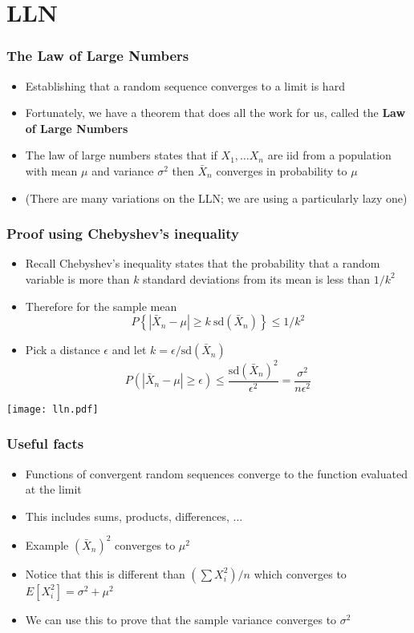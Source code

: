 \documentclass[aspectratio=169]{beamer}
\begin{document}
\section{LLN}
\begin{frame}\frametitle{The Law of Large Numbers}
  \begin{itemize}
  \item Establishing that a random sequence converges to a limit is hard
  \item Fortunately, we have a theorem that does all the work for us, called
    the {\bf Law of Large Numbers}
  \item The law of large numbers states that if $X_1,\ldots X_n$ are iid
    from a population with mean $\mu$ and variance $\sigma^2$ then $\bar
    X_n$ converges in probability to $\mu$
  \item (There are many variations on the LLN; we are using a particularly
    lazy one)
  \end{itemize}
\end{frame}

\begin{frame}\frametitle{Proof using Chebyshev's inequality}
  \begin{itemize}
  \item Recall Chebyshev's inequality states that the probability that a random 
    variable is more than $k$ standard deviations from its mean is less than $1/k^2$
  \item Therefore for the sample mean
    $$
    P\left\{|\bar X_n - \mu| \geq k ~\mbox{sd}(\bar X_n)\right\} \leq 1 / k ^ 2
    $$
  \item Pick a distance $\epsilon$ and let $k = \epsilon / \mbox{sd}(\bar X_n)$
    $$
    P(|\bar X_n - \mu| \geq \epsilon) \leq \frac{\mbox{sd}(\bar X_n)^2}{\epsilon^2}
    = \frac{\sigma^2}{n\epsilon^2}
    $$
  \end{itemize}
\end{frame}


\begin{frame}
  \texttt{[image: lln.pdf]}
\end{frame}

\begin{frame}\frametitle{Useful facts}
  \begin{itemize}
  \item Functions of convergent random sequences converge to 
    the function evaluated at the limit
  \item This includes sums, products, differences, ...
  \item Example $(\bar X_n) ^2$ converges to $\mu^2$
  \item Notice that this is different than $(\sum X_i^2) / n$ which converges
    to $E[X_i^2] = \sigma^2 + \mu^2$
  \item We can use this to prove that the sample variance converges to
    $\sigma^2$
  \end{itemize}
\end{frame}
\end{document}
